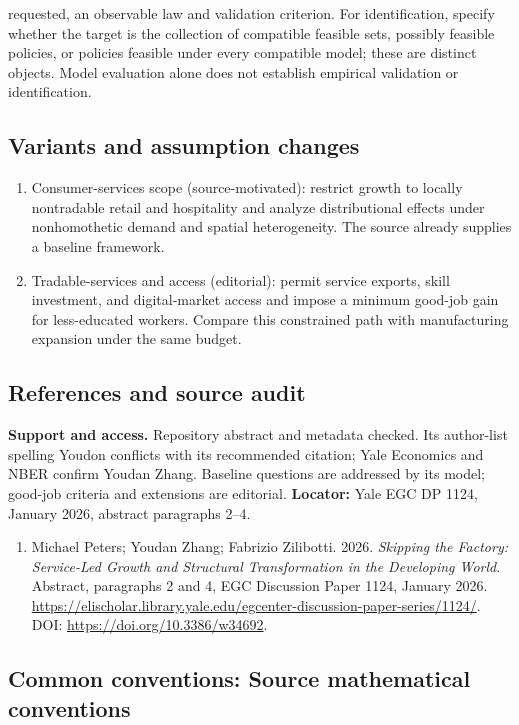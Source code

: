\documentclass[11pt,a4paper]{article}
\begin{document}
requested, an observable law and validation criterion. For identification, specify whether the target is the collection of compatible feasible sets, possibly feasible policies, or policies feasible under every compatible model; these are distinct objects. Model evaluation alone does not establish empirical validation or identification.
\subsection*{Variants and assumption changes}
\begin{enumerate}
\item Consumer-services scope (source-motivated): restrict growth to locally nontradable retail and hospitality and analyze distributional effects under nonhomothetic demand and spatial heterogeneity. The source already supplies a baseline framework.
\item Tradable-services and access (editorial): permit service exports, skill investment, and digital-market access and impose a minimum good-job gain for less-educated workers. Compare this constrained path with manufacturing expansion under the same budget.
\end{enumerate}
\subsection*{References and source audit}
\textbf{Support and access.} Repository abstract and metadata checked. Its author-list spelling Youdon conflicts with its recommended citation; Yale Economics and NBER confirm Youdan Zhang. Baseline questions are addressed by its model; good-job criteria and extensions are editorial. \textbf{Locator:} Yale EGC DP 1124, January 2026, abstract paragraphs 2--4.
\begin{enumerate}\raggedright
\item\hypertarget{definitions:source:30007660:1}{} Michael Peters; Youdan Zhang; Fabrizio Zilibotti. 2026. \emph{Skipping the Factory: Service-Led Growth and Structural Transformation in the Developing World}. Abstract, paragraphs 2 and 4, EGC Discussion Paper 1124, January 2026.
\url{https://elischolar.library.yale.edu/egcenter-discussion-paper-series/1124/}.
DOI: \url{https://doi.org/10.3386/w34692}.
\end{enumerate}

\subsection*{Common conventions: Source mathematical conventions}
\end{document}
